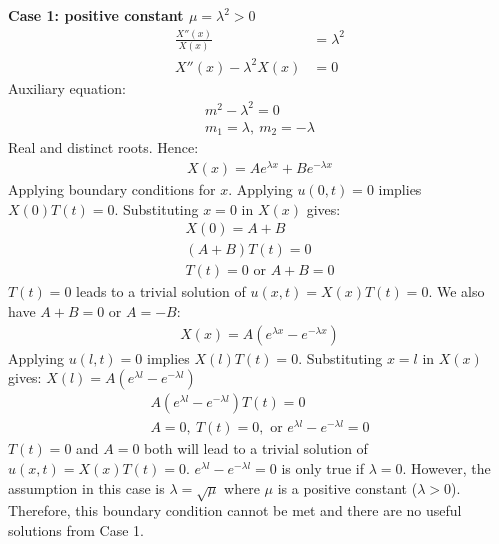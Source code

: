 \documentclass[11pt]{article}
\numberwithin{equation}{section}
\begin{document}
\textbf{Case 1: positive constant $\mu = \lambda^2 > 0$}
\begin{align}
	\frac{X''\left(x\right)}{X\left(x\right)} &= \lambda^2\\
	X''\left(x\right) - \lambda^2X\left(x\right) &= 0 
\end{align}
Auxiliary equation:
\begin{gather}
	m^2 - \lambda^2 = 0\\
	m_1 = \lambda, \ m_2 = -\lambda
\end{gather}
Real and distinct roots. Hence:
\begin{align}
	X(x) = Ae^{\lambda x} + Be^{-\lambda x}
\end{align}
Applying boundary conditions for $x$. Applying $u\left(0,t\right) = 0$ implies $X(0)T(t) = 0$. Substituting $x=0$ in $X(x)$ gives:
\begin{gather}
	X(0) = A + B\\
	\left(A+B\right)T(t) = 0\\
	T(t) = 0 \textrm{ or } A + B =0
\end{gather}
$T(t) = 0$ leads to a trivial solution of $u(x,t) = X(x)T(t) = 0$. We also have $A + B = 0$ or $A = - B$:
\begin{gather}
	X(x) = A\left(e^{\lambda x} - e^{-\lambda x}\right)
\end{gather}
Applying $u(l,t) = 0$ implies $X(l)T(t) = 0$. Substituting $x=l$ in $X(x)$ gives: $X(l) = A\left(e^{\lambda l} - e^{-\lambda l}\right)$
\begin{gather}
	A\left(e^{\lambda l} - e^{-\lambda l}\right)T(t) = 0\\
	A = 0, \ T(t) = 0, \textrm{ or } e^{\lambda l} - e^{-\lambda l} = 0
\end{gather}
$T(t) = 0$ and $A=0$ both will lead to a trivial solution of $u(x,t) = X(x)T(t) =0$. $e^{\lambda l} - e^{-\lambda l} = 0$ is only true if $\lambda = 0$. However, the assumption in this case is $\lambda = \sqrt{\mu}$ where $\mu$ is a positive constant ($\lambda > 0$). Therefore, this boundary condition cannot be met and there are no useful solutions from Case 1.
\end{document}
